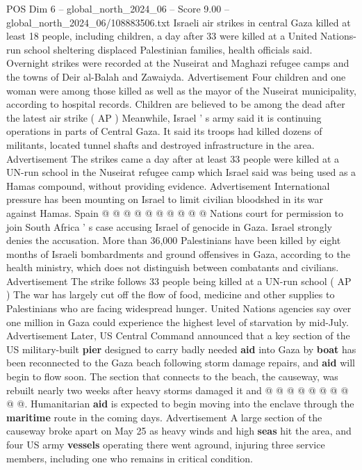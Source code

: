 \begin{textsample}{POS Dim 6 – global\_north\_2024\_06 – Score 9.00 – global\_north\_2024\_06/108883506.txt}  \label{ex:f6_pos_132}
Israeli air strikes in central Gaza killed at least 18 people, including children, a day after 33 were killed at a United Nations-run school sheltering displaced Palestinian families, health officials said.
Overnight strikes were recorded at the Nuseirat and Maghazi refugee camps and the towns of Deir al-Balah and Zawaiyda.
Advertisement Four children and one woman were among those killed as well as the mayor of the Nuseirat municipality, according to hospital records.
Children are believed to be among the dead after the latest air strike ( AP ) Meanwhile, Israel ' s army said it is continuing operations in parts of Central Gaza.
It said its troops had killed dozens of militants, located tunnel shafts and destroyed infrastructure in the area.
Advertisement The strikes came a day after at least 33 people were killed at a UN-run school in the Nuseirat refugee camp which Israel said was being used as a Hamas compound, without providing evidence.
Advertisement International pressure has been mounting on Israel to limit civilian bloodshed in its war against Hamas.
Spain @ @ @ @ @ @ @ @ @ @ Nations court for permission to join South Africa ' s case accusing Israel of genocide in Gaza.
Israel strongly denies the accusation.
More than 36,000 Palestinians have been killed by eight months of Israeli bombardments and ground offensives in Gaza, according to the health ministry, which does not distinguish between combatants and civilians.
Advertisement The strike follows 33 people being killed at a UN-run school ( AP ) The war has largely cut off the flow of food, medicine and other supplies to Palestinians who are facing widespread hunger.
United Nations agencies say over one million in Gaza could experience the highest level of starvation by mid-July.
Advertisement Later, US Central Command announced that a key section of the US military-built \textbf{pier} designed to carry badly needed \textbf{aid} into Gaza by \textbf{boat} has been reconnected to the Gaza beach following storm damage repairs, and \textbf{aid} will begin to flow soon.
The section that connects to the beach, the causeway, was rebuilt nearly two weeks after heavy storms damaged it and @ @ @ @ @ @ @ @ @ @.
Humanitarian \textbf{aid} is expected to begin moving into the enclave through the \textbf{maritime} route in the coming days.
Advertisement A large section of the causeway broke apart on May 25 as heavy winds and high \textbf{seas} hit the area, and four US army \textbf{vessels} operating there went aground, injuring three service members, including one who remains in critical condition.

\end{textsample}
